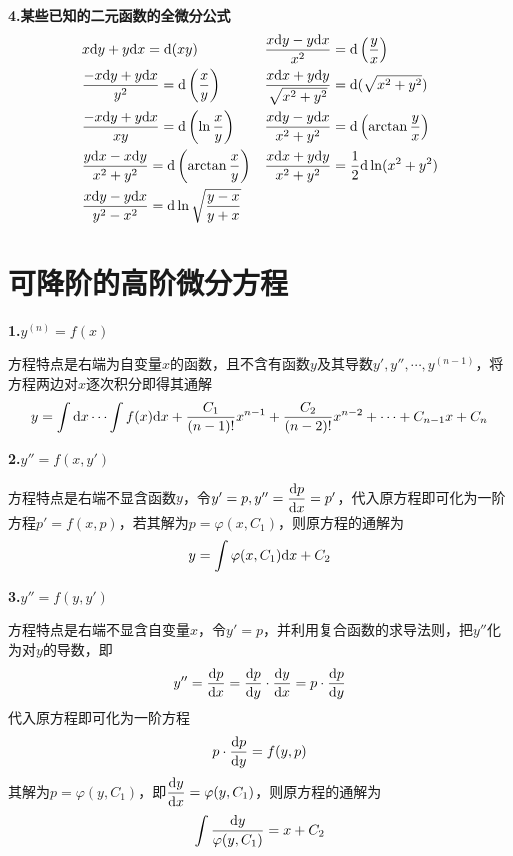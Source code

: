 \textbf{4.某些已知的二元函数的全微分公式}
\begin{align*}
    & x\mathrm{d} y+y\mathrm{d} x=\mathrm{d}(xy) && \dfrac{x\mathrm{d} y-y\mathrm{d} x}{x^2}=\mathrm{d}\left(\dfrac{y}{x}\right) \\
    & \dfrac{-x\mathrm{d} y+y\mathrm{d} x}{y^2}=\mathrm{d}\left(\dfrac{x}{y}\right) && \dfrac{x\mathrm{d} x+y\mathrm{d} y}{\sqrt{x^2+y^2}}=\mathrm{d}(\sqrt{x^2+y^2}) \\
    & \dfrac{-x\mathrm{d} y+y\mathrm{d} x}{xy}=\mathrm{d}\left(\ln\dfrac{x}{y}\right) && \dfrac{x\mathrm{d} y-y\mathrm{d} x}{x^2+y^2}=\mathrm{d}\left(\arctan\dfrac{y}{x}\right) \\
    & \dfrac{y\mathrm{d} x-x\mathrm{d} y}{x^2+y^2}=\mathrm{d}\left(\arctan\dfrac{x}{y}\right) && \dfrac{x\mathrm{d} x+y\mathrm{d} y}{x^2+y^2}=\dfrac{1}{2}\mathrm{d}\ln(x^2+y^2) \\
    & \dfrac{x\mathrm{d} y-y\mathrm{d} x}{y^2-x^2}=\mathrm{d}\ln\sqrt{\dfrac{y-x}{y+x}}
\end{align*}

\section{可降阶的高阶微分方程}
\textbf{1.$y^{(n)}=f(x)$}

方程特点是右端为自变量$x$的函数，且不含有函数$y$及其导数$y',y'',\cdots,y^{(n-1)}$，将方程两边对$x$逐次积分即得其通解
\begin{equation*}
    y=\int\mathrm{d} x\cdots\int f(x)\mathrm{d} x+\dfrac{C_1}{(n-1)!}x^{n-1}+\dfrac{C_2}{(n-2)!}x^{n-2}+\cdots+C_{n-1}x+C_n
\end{equation*}

\textbf{2.$y''=f(x,y')$}

方程特点是右端不显含函数$y$，令$y'=p,y''=\dfrac{\mathrm{d} p}{\mathrm{d} x}=p'$，代入原方程即可化为一阶方程$p'=f(x,p)$，若其解为$p=\varphi(x,C_1)$，则原方程的通解为
\begin{equation*}
    y=\int\varphi(x,C_1)\mathrm{d} x+C_2
\end{equation*}

\textbf{3.$y''=f(y,y')$}

方程特点是右端不显含自变量$x$，令$y'=p$，并利用复合函数的求导法则，把$y''$化为对$y$的导数，即
\begin{equation*}
    y''=\dfrac{\mathrm{d} p}{\mathrm{d} x}=\dfrac{\mathrm{d} p}{\mathrm{d} y}\cdot\dfrac{\mathrm{d} y}{\mathrm{d} x}=p\cdot\dfrac{\mathrm{d} p}{\mathrm{d} y}
\end{equation*}
代入原方程即可化为一阶方程
\begin{equation*}
    p\cdot\dfrac{\mathrm{d} p}{\mathrm{d} y}=f(y,p)
\end{equation*}
其解为$p=\varphi(y,C_1)$，即$\dfrac{\mathrm{d} y}{\mathrm{d} x}=\varphi(y,C_1)$，则原方程的通解为
\begin{equation*}
    \int\dfrac{\mathrm{d} y}{\varphi(y,C_1)}=x+C_2
\end{equation*}

